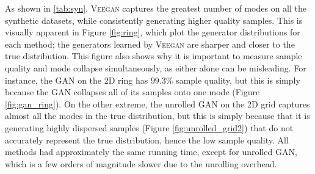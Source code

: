 \documentclass{article}
\newcommand{\acronym}{\textsc{Veegan}\xspace}
\begin{document}
As shown in \autoref{tab:syn},  \acronym  captures the greatest number of modes on all the synthetic datasets, while consistently generating higher quality samples. 
This is visually apparent in Figure \ref{fig:ring}, which plot the generator distributions for each 
method; the generators learned by \acronym are sharper
and closer to the true distribution. This
figure also shows why it is important to measure sample quality
and mode collapse simultaneously, as either alone can be 
misleading.
For instance, the GAN on the 2D ring has $99.3\%$ sample quality, but this is simply because the GAN collapses all
of its samples onto one mode (Figure \ref{fig:gan_ring}). On the other extreme,
the unrolled GAN on the 2D grid captures almost all the modes in 
the true distribution,
but this is simply because 
that it is generating highly dispersed samples (Figure \ref{fig:unrolled_grid2}) that do not accurately represent the true distribution, hence the low sample quality. All methods had approximately the same running time, except for unrolled GAN,
which is a few orders of magnitude slower due to the unrolling overhead.
\end{document}
